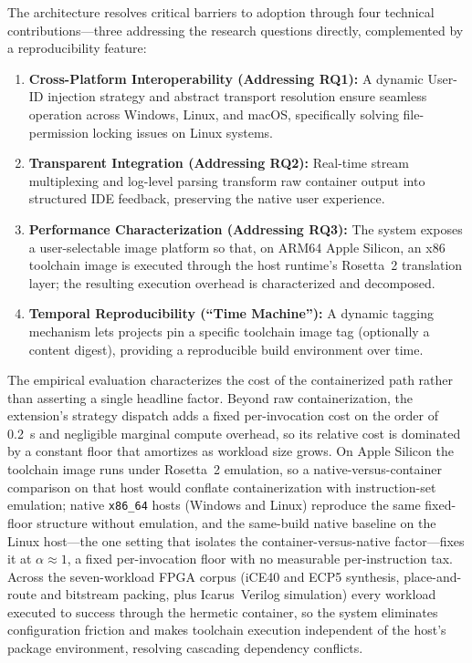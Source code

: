 The architecture resolves critical barriers to adoption through four technical contributions---three addressing the research questions directly, complemented by a reproducibility feature:
\begin{enumerate}
    \item \textbf{Cross-Platform Interoperability (Addressing RQ1):} A dynamic User-ID injection strategy and abstract transport resolution ensure seamless operation across Windows, Linux, and macOS, specifically solving file-permission locking issues on Linux systems.
    \item \textbf{Transparent Integration (Addressing RQ2):} Real-time stream multiplexing and log-level parsing transform raw container output into structured IDE feedback, preserving the native user experience.
    \item \textbf{Performance Characterization (Addressing RQ3):} The system exposes a user-selectable image platform so that, on ARM64 Apple Silicon, an x86 toolchain image is executed through the host runtime's Rosetta~2 translation layer; the resulting execution overhead is characterized and decomposed.
    \item \textbf{Temporal Reproducibility (``Time Machine''):} A dynamic tagging mechanism lets projects pin a specific toolchain image tag (optionally a content digest), providing a reproducible build environment over time.
\end{enumerate}

The empirical evaluation characterizes the cost of the containerized path rather than asserting a single headline factor. Beyond raw containerization, the extension's strategy dispatch adds a fixed per-invocation cost on the order of \SI{0.2}{\second} and negligible marginal compute overhead, so its relative cost is dominated by a constant floor that amortizes as workload size grows. On Apple Silicon the toolchain image runs under Rosetta~2 emulation, so a native-versus-container comparison on that host would conflate containerization with instruction-set emulation; native \texttt{x86\_64} hosts (Windows and Linux) reproduce the same fixed-floor structure without emulation, and the same-build native baseline on the Linux host---the one setting that isolates the container-versus-native factor---fixes it at $\alpha \approx 1$, a fixed per-invocation floor with no measurable per-instruction tax. Across the seven-workload FPGA corpus (iCE40 and ECP5 synthesis, place-and-route and bitstream packing, plus Icarus~Verilog simulation) every workload executed to success through the hermetic container, so the system eliminates configuration friction and makes toolchain execution independent of the host's package environment, resolving cascading dependency conflicts.
